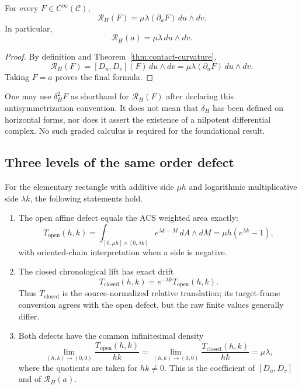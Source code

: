 \begin{proposition}
\label{prop:horizontal-differential-curvature}
For every \(F\in C^\infty(\mathcal C)\),
\begin{equation}
    \mathcal R_H(F)
      =\mu\lambda(\partial_aF)\,du\wedge dv.
    \label{eq:horizontal-scalar-curvature}
\end{equation}
In particular,
\[
    \mathcal R_H(a)=\mu\lambda\,du\wedge dv.
\]
\end{proposition}

\begin{proof}
By definition and Theorem~\ref{thm:contact-curvature},
\[
    \mathcal R_H(F)
       =[D_u,D_v](F)\,du\wedge dv
       =\mu\lambda(\partial_aF)\,du\wedge dv.
\]
Taking \(F=a\) proves the final formula.
\end{proof}

One may use \(\delta_H^2F\) as shorthand for
\(\mathcal R_H(F)\) after declaring this antisymmetrization convention.  It
does not mean that \(\delta_H\) has been defined on horizontal forms, nor does
it assert the existence of a nilpotent differential complex.  No such graded
calculus is required for the foundational result.

\subsection{Three levels of the same order defect}

\begin{proposition}
\label{prop:torsion-curvature-synthesis}
For the elementary rectangle with additive side \(\mu h\) and logarithmic
multiplicative side \(\lambda k\), the following statements hold.
\begin{enumerate}
    \item The open affine defect equals the ACS weighted area exactly:
    \[
        T_{\mathrm{open}}(h,k)
          =\int_{[0,\mu h]\times[0,\lambda k]}
              e^{\lambda k-M}\,dA\wedge dM
          =\mu h(e^{\lambda k}-1),
    \]
    with oriented-chain interpretation when a side is negative.
    \item The closed chronological lift has exact drift
    \[
        T_{\mathrm{closed}}(h,k)
          =e^{-\lambda k}T_{\mathrm{open}}(h,k).
    \]
    Thus \(T_{\mathrm{closed}}\) is the source-normalized relative translation;
    its target-frame conversion agrees with the open defect, but the raw finite
    values generally differ.
    \item Both defects have the common infinitesimal density
    \[
        \lim_{(h,k)\to(0,0)}
          \frac{T_{\mathrm{open}}(h,k)}{hk}
        =\lim_{(h,k)\to(0,0)}
          \frac{T_{\mathrm{closed}}(h,k)}{hk}
        =\mu\lambda,
    \]
    where the quotients are taken for \(hk\ne0\).  This is the coefficient of
    \([D_u,D_v]\) and of \(\mathcal R_H(a)\).
\end{enumerate}
\end{proposition}

